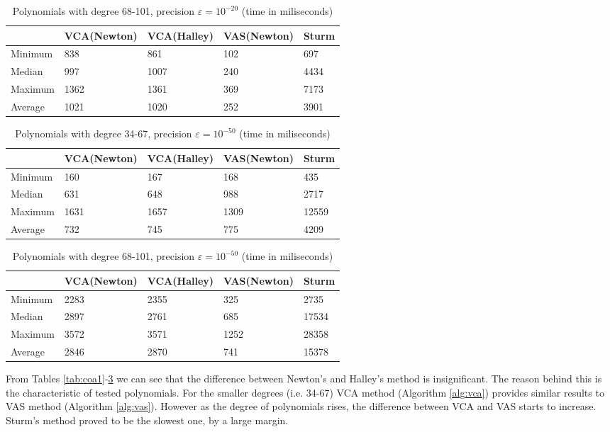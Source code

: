 \documentclass[
  digital, %
  notable,   %
  nolof,     %
  nolot,     %
	final, %
]{fithesis3}
\begin{document}
\begin{table}
  \begin{tabular*}{\textwidth}{lllll}
    \toprule
     & VCA(Newton) & VCA(Halley) & VAS(Newton) & Sturm \\
    \midrule
			Minimum & 838 & 861 & 102 & 697 \\
			Median & 997 & 1007 & 240 & 4434 \\
			Maximum & 1362 & 1361 & 369 & 7173 \\
			Average & 1021 & 1020 & 252 & 3901 \\
    \bottomrule
  \end{tabular*}
  \caption{Polynomials with degree 68-101, precision $\varepsilon = 10^{-20}$ (time in miliseconds)}
  \label{tab:coa2}
\end{table}

\begin{table}
  \begin{tabular*}{\textwidth}{lllll}
    \toprule
     & VCA(Newton) & VCA(Halley) & VAS(Newton) & Sturm \\
    \midrule
			Minimum & 160 & 167 & 168 & 435 \\
			Median & 631 & 648 & 988 & 2717 \\
			Maximum & 1631 & 1657 & 1309 & 12559 \\
			Average & 732 & 745 & 775 & 4209 \\
    \bottomrule
  \end{tabular*}
  \caption{Polynomials with degree 34-67, precision $\varepsilon = 10^{-50}$ (time in miliseconds)}
  \label{tab:coa3}
\end{table}

\begin{table}
  \begin{tabular*}{\textwidth}{lllll}
    \toprule
     & VCA(Newton) & VCA(Halley) & VAS(Newton) & Sturm \\
    \midrule
			Minimum & 2283 & 2355 & 325 & 2735 \\
			Median & 2897 & 2761 & 685 & 17534 \\
			Maximum & 3572 & 3571 & 1252 & 28358 \\
			Average & 2846 & 2870 & 741 & 15378 \\
    \bottomrule
  \end{tabular*}
  \caption{Polynomials with degree 68-101, precision $\varepsilon = 10^{-50}$ (time in miliseconds)}
  \label{tab:coa4}
\end{table}

\FloatBarrier
From Tables \ref{tab:coa1}-\ref{tab:coa4} we can see that the difference between Newton's and Halley's method is insignificant. The reason behind this is the characteristic of tested polynomials. For the smaller degrees (i.e. 34-67) VCA method (Algorithm \ref{alg:vca}) provides similar results to VAS method (Algorithm \ref{alg:vas}). However as the degree of polynomials rises, the difference between VCA and VAS starts to increase. Sturm's method proved to be the slowest one, by a large margin.
\end{document}
